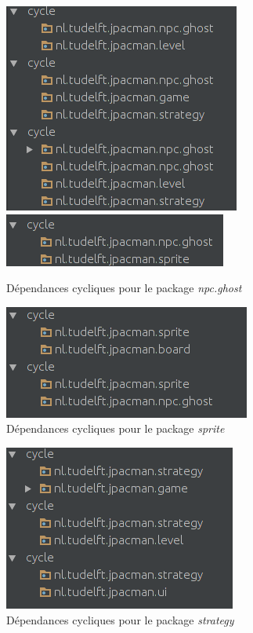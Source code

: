 \documentclass[12pt, openany]{report}
\begin{document}
\begin{figure}[!h]
	\centering
	\includegraphics[scale=0.6]{Images/CyclicDependencyFinal9.png} 
	\includegraphics[scale=0.6]{Images/CyclicDependencyFinal10.png}   
		\caption{Dépendances cycliques pour le package \textit{npc.ghost}}
	\label{CyclicDependencyFinal5}
\end{figure}

\begin{figure}[!h]
	\centering
	\includegraphics[scale=0.6]{Images/CyclicDependencyFinal11.png}    
		\caption{Dépendances cycliques pour le package \textit{sprite}}
	\label{CyclicDependencyFinal6}
\end{figure}

\begin{figure}[!h]
	\centering
	\includegraphics[scale=0.6]{Images/CyclicDependencyFinal12.png}    
		\caption{Dépendances cycliques pour le package \textit{strategy}}
	\label{CyclicDependencyFinal7}
\end{figure}
\end{document}

